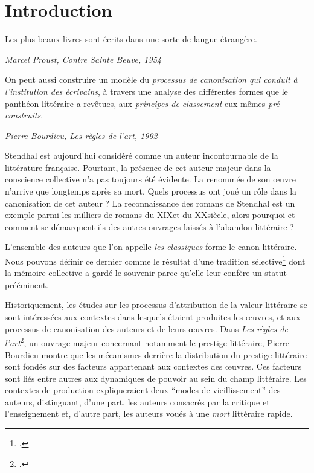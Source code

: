 \part*{Introduction}

\vspace*{\fill}
\epigraph{Les plus beaux livres sont écrits dans une sorte de langue étrangère.}{\textit{Marcel Proust, Contre Sainte Beuve, 1954}}
\epigraph{On peut aussi construire un modèle du \textit{processus de canonisation qui conduit à l'institution des écrivains}, à travers une analyse des différentes formes que le panthéon littéraire a revêtues, aux \textit{principes de classement} eux-mêmes \textit{pré-construits}.}{\textit{Pierre Bourdieu, Les règles de l'art, 1992}}

\vfill\clearpage

Stendhal est aujourd'hui considéré comme un auteur incontournable de la littérature française. Pourtant, la présence de cet auteur majeur dans la conscience collective n'a pas toujours été évidente. La renommée de son œuvre n'arrive que longtemps après sa mort. Quels processus ont joué un rôle dans la canonisation de cet auteur ? La reconnaissance des romans de Stendhal est un exemple parmi les milliers de romans du XIX\ieme et du XX\ieme siècle, alors pourquoi et comment se démarquent-ils des autres ouvrages laissés à l'abandon littéraire ? 

L'ensemble des auteurs que l'on appelle \textit{les classiques} forme le canon littéraire. Nous pouvons définir ce dernier comme le résultat d'une tradition sélective\footcites{pollock_differencing_1999} dont la mémoire collective a gardé le souvenir parce qu’elle leur confère un statut prééminent.


Historiquement, les études sur les processus d'attribution de la valeur littéraire se sont intéressées aux contextes dans lesquels étaient produites les œuvres, et aux processus de canonisation des auteurs et de leurs œuvres. Dans \textit{Les règles de l'art}\footcites{bourdieu_les_1992}, un ouvrage majeur concernant notamment le prestige littéraire, Pierre Bourdieu montre que les mécanismes derrière la distribution du prestige littéraire sont fondés sur des facteurs appartenant aux contextes des œuvres. Ces facteurs sont liés entre autres aux dynamiques de pouvoir au sein du champ littéraire. Les contextes de production expliqueraient deux \enquote{modes de vieillissement} des auteurs, distinguant, d'une part, les auteurs consacrés par la critique et l'enseignement et, d'autre part, les auteurs voués à une \textit{mort} littéraire rapide.

